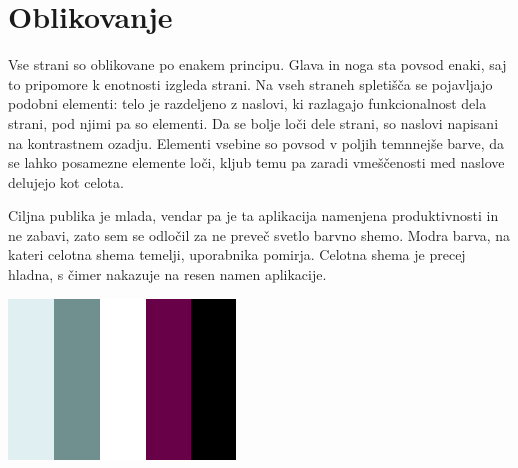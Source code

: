 \documentclass[12pt]{article}
\begin{document}
\newpage
\section{Oblikovanje}
Vse strani so oblikovane po enakem principu. Glava in noga sta povsod enaki, saj to pripomore k enotnosti izgleda strani. Na vseh straneh spletišča se pojavljajo podobni elementi: telo je razdeljeno z naslovi, ki razlagajo funkcionalnost dela strani, pod njimi pa so elementi. Da se bolje loči dele strani, so naslovi napisani na kontrastnem ozadju. Elementi vsebine so povsod v poljih temnnejše barve, da se lahko posamezne elemente loči, kljub temu pa zaradi vmeščenosti med naslove delujejo kot celota.

Ciljna publika je mlada, vendar pa je ta aplikacija namenjena produktivnosti in ne zabavi, zato sem se odločil za ne preveč svetlo barvno shemo. Modra barva, na kateri celotna shema temelji, uporabnika pomirja. Celotna shema je precej hladna, s čimer nakazuje na resen namen aplikacije. 
\newline
\\
\begin{center}
\includegraphics[scale=1.6]{barvna_shema.png}
\end{center}
\end{document}
